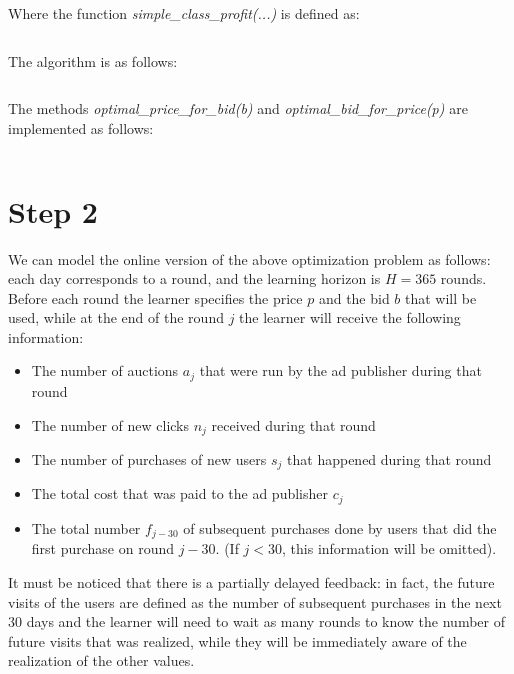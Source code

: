 \documentclass[11pt]{article} %
\begin{document}
Where the function \textit{simple\_class\_profit(...)} is defined as:
\inputminted{python}{code/step1_simple_class_profit.py}
\begin{samepage}
The algorithm is as follows:
\inputminted{python}{code/step1.py}
\end{samepage}
The methods \textit{optimal\_price\_for\_bid(b)} and \textit{optimal\_bid\_for\_price(p)} are implemented as follows:
\inputminted{python}{code/step1_support.py}

\clearpage
\section{Step 2}
We can model the online version of the above optimization problem as follows: each day corresponds to a round, and the learning horizon is $H=365$ rounds. Before each round the learner specifies the price $p$ and the bid $b$ that will be used, while at the end of the round $j$ the learner will receive the following information:
\begin{itemize}
\item The number of auctions $a_j$ that were run by the ad publisher during that round
\item The number of new clicks  $n_j$ received during that round
\item The number of purchases of new users $s_j$ that happened during that round 
\item The total cost that was paid to the ad publisher $c_j$
\item The total number $f_{j-30}$ of subsequent purchases done by users that did the first purchase on round $j-30$. (If $j < 30$, this information will be omitted).
\end{itemize}
It must be noticed that there is a partially delayed feedback: in fact, the future visits of the users are defined as the number of subsequent purchases in the next 30 days and the learner will need to wait as many rounds to know the number of future visits that was realized, while they will be immediately aware of the realization of the other values.\\
\end{document}
